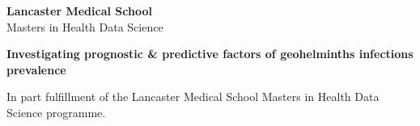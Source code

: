 
\begin{titlepage}

        \begin{center}

            \vspace*{1cm}

            \textbf{Lancaster Medical School}\\
            Masters in Health Data Science

            \vspace{3.5cm}

            \textbf{Investigating prognostic \& predictive factors of geohelminths infections prevalence}\\
            \thanklessauthor

            \vfill

            In part fulfillment of the Lancaster Medical School Masters in Health Data Science programme.

        \end{center}

\end{titlepage}